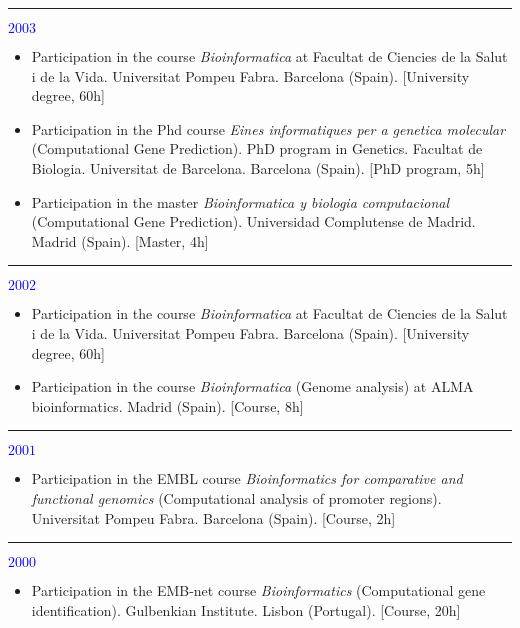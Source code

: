 \textcolor{blue}{\rule{3mm}{3mm}{\Large $2003$}}
\begin{itemize}

\item Participation in the course \emph{Bioinformatica} at Facultat de Ciencies
de la Salut i de la Vida. Universitat Pompeu Fabra. Barcelona (Spain). [University degree, 60h]

\item Participation in the Phd course \emph{Eines informatiques per a genetica molecular} 
(Computational Gene Prediction). PhD program in Genetics. Facultat de Biologia. Universitat de 
Barcelona. Barcelona (Spain). [PhD program, 5h]

\item Participation in the master \emph{Bioinformatica y biologia computacional} 
(Computational Gene Prediction). Universidad Complutense de Madrid. Madrid (Spain). [Master, 4h]\\
\end{itemize}

\textcolor{blue}{\rule{3mm}{3mm}{\Large $2002$}}
\begin{itemize}
\item Participation in the course \emph{Bioinformatica} at Facultat de Ciencies
de la Salut i de la Vida. Universitat Pompeu Fabra. Barcelona (Spain). [University degree, 60h]
\item Participation in the course \emph{Bioinformatica} (Genome analysis) at ALMA bioinformatics.
Madrid (Spain). [Course, 8h]\\
\end{itemize}

\textcolor{blue}{\rule{3mm}{3mm}{\Large $2001$}}
\begin{itemize}
\item Participation in the EMBL course \emph{Bioinformatics for comparative and functional 
genomics} (Computational analysis of promoter regions). Universitat Pompeu Fabra. 
Barcelona (Spain). [Course, 2h]\\
\end{itemize}

\textcolor{blue}{\rule{3mm}{3mm}{\Large $2000$}}
\begin{itemize}
\item Participation in the EMB-net course \emph{Bioinformatics} (Computational gene 
identification). Gulbenkian Institute. Lisbon (Portugal). [Course, 20h]\\
\end{itemize}

